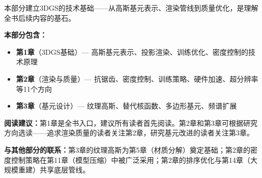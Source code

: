 \vspace{1em}
\begin{center}
\textcolor{techgray}{\small 本部分建立3DGS的技术基础——从高斯基元表示、渲染管线到质量优化，是理解全书后续内容的基石。}
\end{center}
\vspace{0.5em}

\noindent\textbf{本部分包含：}
\begin{itemize}[leftmargin=2em,itemsep=1pt]
\item[\textcolor{techblue}{\textbullet}] \textbf{第1章}（3DGS基础）— 高斯基元表示、投影渲染、训练优化、密度控制的技术原理
\item[\textcolor{techblue}{\textbullet}] \textbf{第2章}（渲染与质量）— 抗锯齿、密度控制、训练策略、硬件加速、超分辨率等11个方向
\item[\textcolor{techblue}{\textbullet}] \textbf{第3章}（基元设计）— 纹理高斯、替代核函数、多边形基元、频谱扩展
\end{itemize}

\noindent\textbf{阅读建议：}第1章是全书入口，建议所有读者首先阅读。第2章和第3章可根据研究方向选读——追求渲染质量的读者关注第2章，研究基元改进的读者关注第3章。

\noindent\textbf{与其他部分的联系：}第3章的纹理高斯为第5章（材质分解）奠定基础；第2章的密度控制策略在第11章（模型压缩）中被广泛采用；第2章的排序优化与第14章（大规模重建）共享底层管线。

\vspace{1em}
